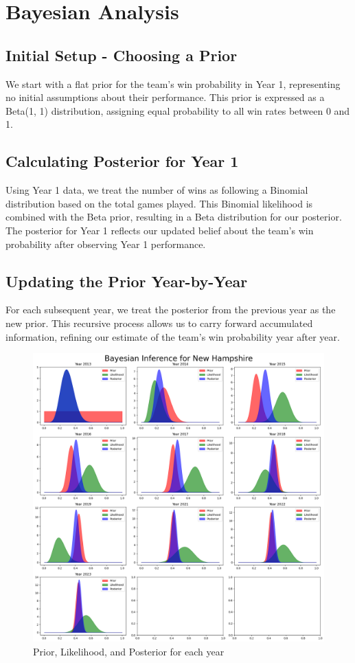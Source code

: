 \section{Bayesian Analysis}

\subsection{Initial Setup - Choosing a Prior}

We start with a flat prior for the team’s win probability in Year 1, representing no initial assumptions about their performance.
This prior is expressed as a Beta(1, 1) distribution, assigning equal probability to all win rates between 0 and 1.

\subsection{Calculating Posterior for Year 1}

Using Year 1 data, we treat the number of wins as following a Binomial distribution based on the total games played.
This Binomial likelihood is combined with the Beta prior, resulting in a Beta distribution for our posterior.
The posterior for Year 1 reflects our updated belief about the team’s win probability after observing Year 1 performance.

\subsection{Updating the Prior Year-by-Year}

For each subsequent year, we treat the posterior from the previous year as the new prior.
This recursive process allows us to carry forward accumulated information, refining our estimate of the team’s win probability year after year.

\begin{figure}[!ht]
  \centering
  \includegraphics[width=.6\textwidth]{Project1/Report/images/posterior-subplots.png}
  \caption{Prior, Likelihood, and Posterior for each year}
\end{figure}

